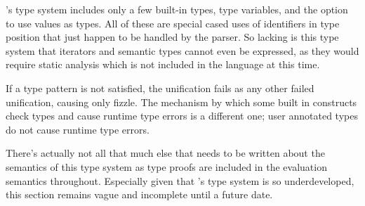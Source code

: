 \Trilogy{}'s type system includes only a few built-in types, type variables,
and the option to use values as types. All of these are special cased uses
of identifiers in type position that just happen to be handled by the parser.
So lacking is this type system that iterators and semantic types cannot even
be expressed, as they would require static analysis which is not included
in the language at this time.

\begin{prooftree}
\end{prooftree}

If a type pattern is not satisfied, the unification fails as any other
failed unification, causing only fizzle. The mechanism by which some
built in constructs check types and cause runtime type errors is a different
one; user annotated types do not cause runtime type errors.

There's actually not all that much else that needs to be written about the
semantics of this type system as type proofs are included in the
evaluation semantics throughout. Especially given that \Trilogy{}'s
type system is so underdeveloped, this section remains vague and
incomplete until a future date.
